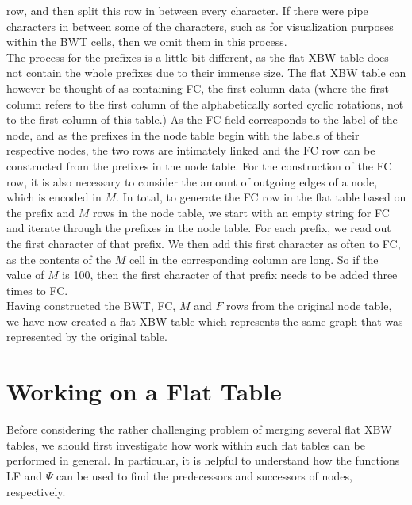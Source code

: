 \documentclass[a4paper,12pt,twoside,BCOR=10mm]{scrbook}
\begin{document}
row, and then split this row in between every character. 
If there were pipe characters in between some of the characters, such as 
for visualization purposes within the BWT cells, then we omit them in this process. \\
The process for the prefixes is a little bit different, as the flat XBW table does 
not contain the whole prefixes due to their immense size. 
The flat XBW table can however be thought of as containing FC, the first column data (where 
the first column refers to the first column of the alphabetically sorted cyclic rotations, 
not to the first column of this table.) 
As the FC field corresponds to the label of the node, and as the prefixes in the node table 
begin with the labels of their respective nodes, the two rows are intimately linked 
and the FC row can be constructed from the prefixes in the node table. 
For the construction of the FC row, it is also necessary to consider the amount of 
outgoing edges of a node, which is encoded in $ M $. 
In total, to generate the FC row in the flat table based on the prefix and $ M $ rows in the 
node table, we start with an empty string for FC and iterate through the prefixes in the node table. 
For each prefix, we read out the first character of that prefix. 
We then add this first character as often to FC, as the contents of the $ M $ cell 
in the corresponding column are long. So if the value of $ M $ is 100, 
then the first character of that prefix needs to be added three times to FC. \\
Having constructed the BWT, FC, $ M $ and $ F $ rows from the original node table, 
we have now created a flat XBW table which represents the same graph that was represented 
by the original table.

\section{Working on a Flat Table}
%

Before considering the rather challenging problem of merging several flat XBW tables, 
we should first investigate how work within such flat tables can be performed in general. 
In particular, it is helpful to understand how 
the functions LF and $ \Psi $ can be used to find the predecessors and successors 
of nodes, respectively.
\end{document}
